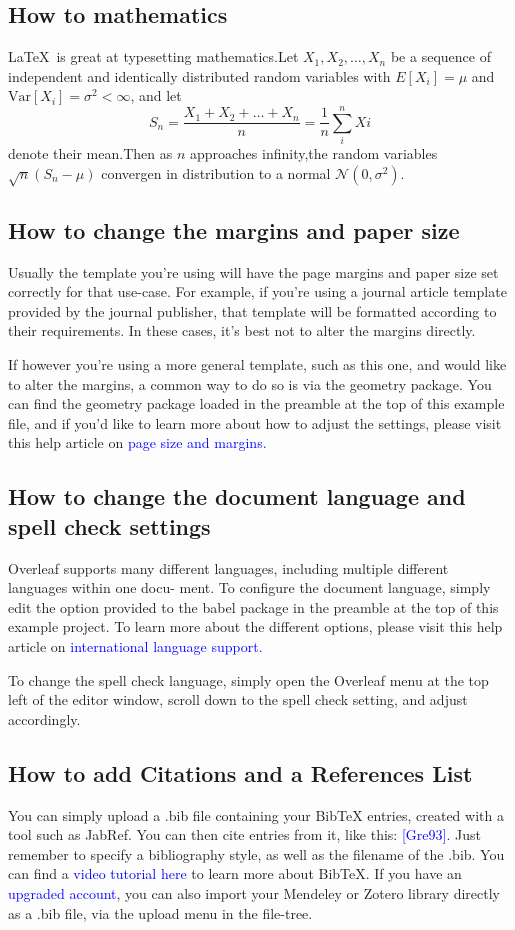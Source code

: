 \documentclass{article}
\begin{document}
\subsection{How to mathematics}
\LaTeX \ is great at typesetting mathematics.Let $X_1 , X_2 , \ldots,X_n$ be a sequence of independent and
identically distributed random variables with $E[X_i ] = \mu$ and $\text{Var}[X_i ] = \sigma^2 < \infty$, and let
\[
S_n=\frac{X_1+X_2+\ldots+X_n}{n}=\frac{1}{n} \sum_{i}^{n} Xi
\]
denote their mean.Then as $n$ approaches infinity,the random variables $\sqrt{n}(S_n-\mu)$ convergen in distribution to a normal $\mathcal{N}(0,\sigma^2)$. 
\subsection{How to change the margins and paper size}
Usually the template you’re using will have the page margins and paper size set correctly for that
use-case. For example, if you’re using a journal article template provided by the journal publisher,
that template will be formatted according to their requirements. In these cases, it’s best not to alter
the margins directly.

If however you’re using a more general template, such as this one, and would like to alter the
margins, a common way to do so is via the geometry package. You can find the geometry package
loaded in the preamble at the top of this example file, and if you’d like to learn more about how to
adjust the settings, please visit this help article on \textcolor{blue}{page size and margins.}
\subsection{How to change the document language and spell check settings}
Overleaf supports many different languages, including multiple different languages within one docu-
ment.
To configure the document language, simply edit the option provided to the babel package in the
preamble at the top of this example project. To learn more about the different options, please visit
this help article on \textcolor{blue}{international language support.}

To change the spell check language, simply open the Overleaf menu at the top left of the editor
window, scroll down to the spell check setting, and adjust accordingly.
\subsection{How to add Citations and a References List}
You can simply upload a .bib file containing your BibTeX entries, created with a tool such as JabRef.
You can then cite entries from it, like this: \textcolor{blue}{[Gre93].} Just remember to specify a bibliography style, as
well as the filename of the .bib. You can find a \textcolor{blue}{video tutorial here} to learn more about BibTeX.
If you have an \textcolor{blue}{upgraded account}, you can also import your Mendeley or Zotero library directly as
a .bib file, via the upload menu in the file-tree.
\end{document}
